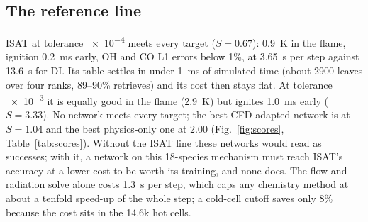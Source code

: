 \documentclass[preprint,review,12pt]{elsarticle}
\begin{document}
\begin{table}[t]
\centering
\caption{Selected protocol v2 results (pure mode, 4 ranks). Full list in \texttt{scores\_v2.csv}.}
\label{tab:scores}
\small
{}
\end{table}

\subsection{The reference line}
ISAT at tolerance \num{e-4} meets every target ($S=0.67$): 0.9~K in the flame, ignition 0.2~ms early, OH and CO
L1 errors below 1\%, at 3.65~s per step against 13.6~s for DI. Its table settles in under 1~ms of simulated time
(about 2900 leaves over four ranks, 89--90\% retrieves) and its cost then stays flat. At tolerance \num{e-3} it is
equally good in the flame (2.9~K) but ignites 1.0~ms early ($S=3.33$). No network meets every target; the best
CFD-adapted network is at $S=1.04$ and the best physics-only one at 2.00 (Fig.~\ref{fig:scores},
Table~\ref{tab:scores}). Without the ISAT line these networks would read as successes; with it, a network on this
18-species mechanism must reach ISAT's accuracy at a lower cost to be worth its training, and none does. The flow
and radiation solve alone costs 1.3~s per step, which caps any chemistry method at about a tenfold speed-up of the
whole step; a cold-cell cutoff saves only 8\% because the cost sits in the 14.6k hot cells.
\end{document}
